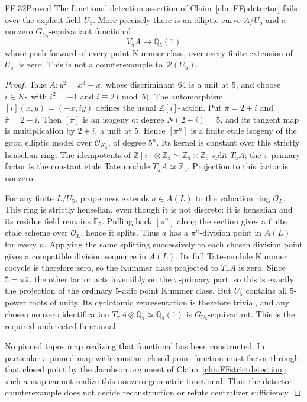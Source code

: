 \begin{claim}{FF.32}{Proved}\label{clm:FFcyclotomicdetector}
The functional-detection assertion of
Claim~\ref{clm:FFpdetector} fails over the
explicit field \(U_5\). More precisely there
is an elliptic curve \(A/U_5\) and a nonzero
\(G_{U_5}\)-equivariant functional
\[
               V_5A\longrightarrow\mathbb Q_5(1)
\]
whose push-forward of every point Kummer class,
over every finite extension of \(U_5\), is zero.
This is not a counterexample to
\(\mathcal R(U_5)\).
\end{claim}
\begin{proof}
Take
\(A:y^2=x^3-x\), whose discriminant \(64\)
is a unit at \(5\), and choose
\(i\in K_5\) with \(i^2=-1\) and
\(i\equiv2\pmod5\). The automorphism
\([i](x,y)=(-x,iy)\) defines the usual
\(\mathbb Z[i]\)-action. Put
\(\pi=2+i\) and \(\bar\pi=2-i\).
Then \([\pi]\) is an isogeny of degree
\(N(2+i)=5\), and its tangent map is
multiplication by \(2+i\), a unit at \(5\).
Hence \([\pi^n]\) is a finite etale isogeny
of the good elliptic model over
\(\mathcal O_{K_5}\), of degree \(5^n\).
Its kernel is constant over this strictly
henselian ring. The idempotents of
\(\mathbb Z[i]\otimes\mathbb Z_5
\simeq\mathbb Z_5\times\mathbb Z_5\)
split \(T_5A\); the \(\pi\)-primary factor
is the constant etale Tate module
\(T_\pi A\simeq\mathbb Z_5\).
Projection to this factor is nonzero.

For any finite \(L/U_5\), properness extends
\(a\in A(L)\) to the valuation ring
\(\mathcal O_L\). This ring is strictly
henselian, even though it is not discrete:
it is henselian and its residue field remains
\(\overline{\mathbb F}_5\). Pulling back
\([\pi^n]\) along the section gives a finite
etale scheme over \(\mathcal O_L\), hence
it splits. Thus \(a\) has a \(\pi^n\)-division
point in \(A(L)\) for every \(n\). Applying
the same splitting successively to each chosen
division point gives a compatible division
sequence in \(A(L)\). Its full Tate-module
Kummer cocycle is therefore zero, so the
Kummer class projected to \(T_\pi A\) is zero.
Since \(5=\pi\bar\pi\), the other factor
acts invertibly on the \(\pi\)-primary part,
so this is exactly the projection of the
ordinary \(5\)-adic point Kummer class.
But \(U_5\) contains all \(5\)-power roots
of unity. Its cyclotomic representation is
therefore trivial, and any chosen nonzero
identification
\(T_\pi A\otimes\mathbb Q_5\simeq
\mathbb Q_5(1)\) is \(G_{U_5}\)-equivariant.
This is the required undetected functional.

No pinned topos map realizing that functional
has been constructed. In particular a pinned
map with constant closed-point function must
factor through that closed point by the
Jacobson argument of
Claim~\ref{clm:FFstrictdetection}; such a map
cannot realize this nonzero geometric
functional. Thus the detector counterexample
does not decide reconstruction or refute
centralizer sufficiency.
\end{proof}

